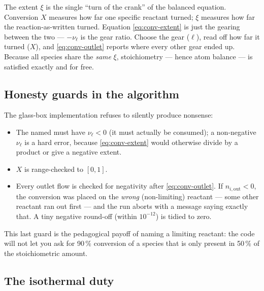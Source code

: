 \documentclass[11pt,a4paper]{article}
\begin{document}
\begin{intuition}
The extent $\xi$ is the single ``turn of the crank'' of the balanced
equation. Conversion $X$ measures how far one specific reactant turned;
$\xi$ measures how far the reaction-as-written turned. Equation
\eqref{eq:conv-extent} is just the gearing between the two ---
$-\nu_\ell$ is the gear ratio. Choose the gear ($\ell$), read off how
far it turned ($X$), and \eqref{eq:conv-outlet} reports where every
other gear ended up. Because all species share the \emph{same} $\xi$,
stoichiometry --- hence atom balance --- is satisfied exactly and for
free.
\end{intuition}

\subsection{Honesty guards in the algorithm}

The glass-box implementation refuses to silently produce nonsense:

\begin{itemize}
  \item The named  must have $\nu_\ell < 0$
        (it must actually be consumed); a non-negative $\nu_\ell$ is a
        hard error, because \eqref{eq:conv-extent} would otherwise
        divide by a product or give a negative extent.
  \item $X$ is range-checked to $[0,1]$.
  \item Every outlet flow is checked for negativity after
        \eqref{eq:conv-outlet}. If $n_{i,\mathrm{out}} < 0$, the
        conversion was placed on the \emph{wrong} (non-limiting)
        reactant --- some other reactant ran out first --- and the run
        aborts with a message saying exactly that. A tiny negative
        round-off (within $10^{-12}$) is tidied to zero.
\end{itemize}

This last guard is the pedagogical payoff of naming a limiting
reactant: the code will not let you ask for 90\,\% conversion of a
species that is only present in 50\,\% of the stoichiometric amount.

\subsection{The isothermal duty}
\end{document}
